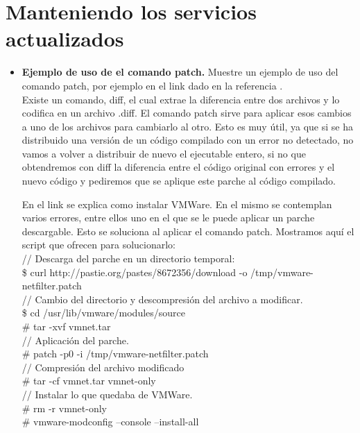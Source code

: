 \section{Manteniendo los servicios actualizados}
\begin{itemize}
	\item \textbf{Ejemplo de uso de el comando patch.} Muestre un ejemplo de uso del comando patch, por ejemplo en el link dado en la referencia \cite{patch}.\\

	Existe un comando, diff\cite{diff}, el cual extrae la diferencia entre dos archivos y lo codifica en un archivo .diff. El comando patch\cite{patch} sirve para aplicar esos cambios a uno de los archivos para cambiarlo al otro. Esto es muy útil, ya que si se ha distribuido una versión de un código compilado con un error no detectado, no vamos a volver a distribuir de nuevo el ejecutable entero, si no que obtendremos con diff la diferencia entre el código original con errores y el nuevo código y pediremos que se aplique este parche al código compilado.
	
	En el link se explica como instalar VMWare. En el mismo se contemplan varios errores, entre ellos uno en el que se le puede aplicar un parche descargable. Esto se soluciona al aplicar el comando patch. Mostramos aquí el script que ofrecen para solucionarlo:\\
	
	// Descarga del parche en un directorio temporal:\\
	\$ curl http://pastie.org/pastes/8672356/download -o /tmp/vmware-netfilter.patch\\
	
	// Cambio del directorio y descompresión del archivo a modificar.\\
	\$ cd /usr/lib/vmware/modules/source\\
	\# tar -xvf vmnet.tar\\
	
	// Aplicación del parche.\\
	\# patch -p0 -i /tmp/vmware-netfilter.patch\\
	
	// Compresión del archivo modificado\\
	\# tar -cf vmnet.tar vmnet-only\\
	
	// Instalar lo que quedaba de VMWare.\\
	\# rm -r vmnet-only\\
	\# vmware-modconfig --console --install-all\\

\end{itemize}

